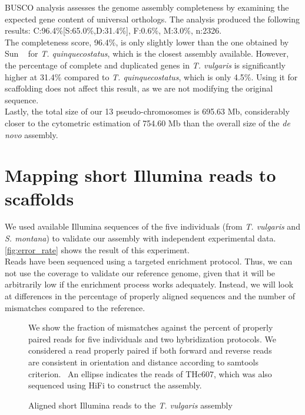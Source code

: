 BUSCO analysis assesses the genome assembly completeness by examining the expected gene content of universal orthologs. The analysis produced the following results: C:96.4\%[S:65.0\%,D:31.4\%], F:0.6\%, M:3.0\%, n:2326.\\

The completeness score, 96.4\%, is only slightly lower than the one obtained by Sun \etal~\cite{sunChromosomelevelAssemblyAnalysis2022} for \textit{T. quinquecostatus}, which is the closest assembly available. However, the percentage of complete and duplicated genes in \textit{T. vulgaris} is significantly higher at 31.4\% compared to \textit{T. quinquecostatus}, which is only 4.5\%. Using it for scaffolding does not affect this result, as we are not modifying the original sequence.\\

Lastly, the total size of our 13 pseudo-chromosomes is 695.63 Mb, considerably closer to the cytometric estimation of  754.60 Mb than the overall size of the \textit{de novo} assembly.  \\


\section*{Mapping short Illumina reads to scaffolds}


We used available Illumina sequences of the five individuals (from \textit{T. vulgaris} and \textit{S. montana}) to validate our assembly with independent experimental data. \autoref{fig:error_rate} shows the result of this experiment.\\

Reads have been sequenced using a targeted enrichment protocol. Thus, we can not use the coverage to validate our reference genome, given that it will be arbitrarily low if the enrichment process works adequately. Instead, we will look at differences in the percentage of properly aligned sequences and the number of mismatches compared to the reference.\\

\begin{figure}
    \begin{center}
        \def\svgwidth{\textwidth}
        
        \caption{Aligned short Illumina reads to the \textit{T. vulgaris} assembly}            
        \label{fig:error_rate}
    \end{center}
    \footnotesize
    We show the fraction of mismatches against the percent of properly paired reads for five individuals and two hybridization protocols. We considered a read properly paired if both forward and reverse reads are consistent in orientation and distance according to samtools criterion.~\cite{danecekTwelveYearsSAMtools2021} An ellipse indicates the reads of THc607, which was also sequenced using \ac{HiFi} to construct the assembly.
\end{figure}  

